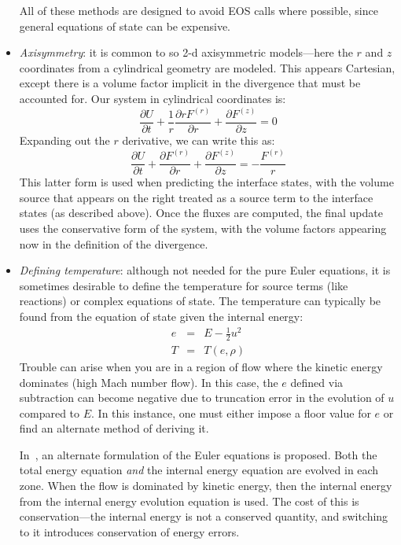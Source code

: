 \documentclass[11pt]{article}
\begin{document}
\begin{itemize}
All of these methods are designed to avoid EOS calls where possible,
since general equations of state can be expensive.


\item {\em Axisymmetry}: it is common to so 2-d axisymmetric models---here
the $r$ and $z$ coordinates from a cylindrical geometry are modeled.  This
appears Cartesian, except there is a volume factor implicit in the 
divergence that must be accounted for.  Our system in cylindrical
coordinates is:
\begin{equation}
\frac{\partial U}{\partial t} 
  + \frac{1}{r}\frac{\partial r F^{(r)}}{\partial r} 
  + \frac{\partial F^{(z)}}{\partial z} = 0
\end{equation}
Expanding out the $r$ derivative, we can write this as:
\begin{equation}
\frac{\partial U}{\partial t} 
  + \frac{\partial F^{(r)}}{\partial r} 
  + \frac{\partial F^{(z)}}{\partial z} = -\frac{F^{(r)}}{r}
\end{equation}
This latter form is used when predicting the interface states, with
the volume source that appears on the right treated as a source term
to the interface states (as described above).  Once the fluxes are
computed, the final update uses the conservative form of the system,
with the volume factors appearing now in the definition of the
divergence.

\item {\em Defining temperature}: although not needed for the pure
  Euler equations, it is sometimes desirable to define the temperature
  for source terms (like reactions) or complex equations of state.
  The temperature can typically be found from the equation of state
  given the internal energy:
  \begin{eqnarray}
  e &=& E - \frac{1}{2} u^2 \\
  T &=& T(e, \rho)
  \end{eqnarray}
  Trouble can arise when you are in a region of flow where the kinetic
  energy dominates (high Mach number flow).  In this case, the $e$ defined
  via subtraction can become negative due to truncation error in the  
  evolution of $u$ compared to $E$.  In this instance, one must either
  impose a floor value for $e$ or find an alternate method of deriving
  it.

  In~\cite{bryan:1995}, an alternate formulation of the Euler equations
  is proposed.  Both the total energy equation {\em and} the internal
  energy equation are evolved in each zone.  When the flow is dominated
  by kinetic energy, then the internal energy from the internal energy
  evolution equation is used.  The cost of this is conservation---the 
  internal energy is not a conserved quantity, and switching to it 
  introduces conservation of energy errors.


\end{itemize}
\end{document}
